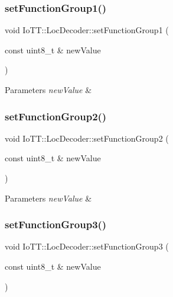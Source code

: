 \subsubsection{\texorpdfstring{set\+Function\+Group1()}{setFunctionGroup1()}}
{\footnotesize\ttfamily void Io\+T\+T\+::\+Loc\+Decoder\+::set\+Function\+Group1 (\begin{DoxyParamCaption}\item[{const uint8\+\_\+t \&}]{new\+Value }\end{DoxyParamCaption})}


\begin{DoxyParams}{Parameters}
{\em new\+Value} & \\
\hline
\end{DoxyParams}
\mbox{\label{classIoTT_1_1LocDecoder_a602470c858cfd13382f9180d6c768051}} 
\subsubsection{\texorpdfstring{set\+Function\+Group2()}{setFunctionGroup2()}}
{\footnotesize\ttfamily void Io\+T\+T\+::\+Loc\+Decoder\+::set\+Function\+Group2 (\begin{DoxyParamCaption}\item[{const uint8\+\_\+t \&}]{new\+Value }\end{DoxyParamCaption})}


\begin{DoxyParams}{Parameters}
{\em new\+Value} & \\
\hline
\end{DoxyParams}
\mbox{\label{classIoTT_1_1LocDecoder_a2698876fc3124c833e15a7ff3fa884d6}} 
\subsubsection{\texorpdfstring{set\+Function\+Group3()}{setFunctionGroup3()}}
{\footnotesize\ttfamily void Io\+T\+T\+::\+Loc\+Decoder\+::set\+Function\+Group3 (\begin{DoxyParamCaption}\item[{const uint8\+\_\+t \&}]{new\+Value }\end{DoxyParamCaption})}


